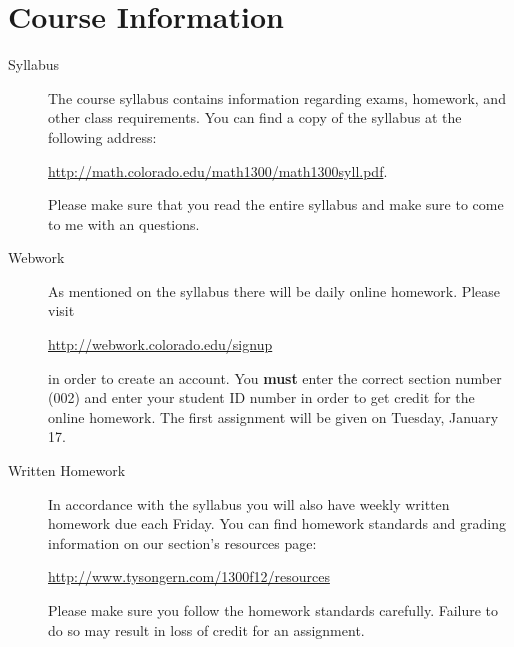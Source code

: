 \documentclass[11pt]{article}
\begin{document}
\section*{Course Information}
\begin{description}
\item[Syllabus] The course syllabus contains information regarding
  exams, homework, and other class requirements.  You can find a copy
  of the syllabus at the following address:
  \begin{center}
    \url{http://math.colorado.edu/math1300/math1300syll.pdf}.
  \end{center}
  Please make sure that you read the entire syllabus and make sure to
  come to me with an questions.

\item[Webwork] As mentioned on the syllabus there will be daily online
  homework.  Please visit
  \begin{center}
    \url{http://webwork.colorado.edu/signup}
  \end{center}
  in order to create an account.  You \textbf{must} enter the correct
  section number (002) and enter your student ID number in order to
  get credit for the online homework.  The first assignment will be
  given on Tuesday, January 17.

\item[Written Homework] In accordance with the syllabus you will also
  have weekly written homework due each Friday.  You can find homework
  standards and grading information on our section's resources page:
  \begin{center}
    \url{http://www.tysongern.com/1300f12/resources}
  \end{center}
  Please make sure you follow the homework standards carefully.
  Failure to do so may result in loss of credit for an assignment.
\end{description}
\end{document}
